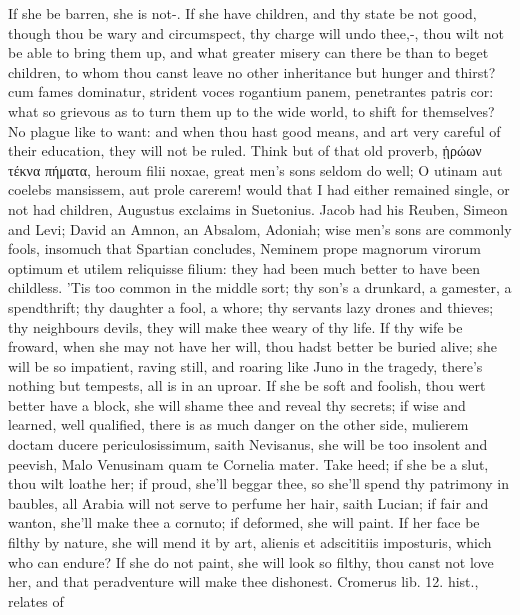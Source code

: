 {If she be barren, she is not-\etc{}. If she have children, and thy
state be not good, though thou be wary and circumspect, thy charge will
undo thee,-, thou wilt not be
able to bring them up, and what greater misery can there be than
to beget children, to whom thou canst leave no other inheritance but
hunger and thirst? cum fames dominatur, strident voces rogantium
panem, penetrantes patris cor: what so grievous as to turn them up to
the wide world, to shift for themselves? No plague like to want: and
when thou hast good means, and art very careful of their education,
they will not be ruled. Think but of that old proverb, ᾑρώων τέκνα
πήματα, heroum filii noxae, great men's sons seldom do well; O utinam
aut coelebs mansissem, aut prole carerem! would that I had either
remained single, or not had children, Augustus exclaims in
Suetonius. Jacob had his Reuben, Simeon and Levi; David an Amnon, an
Absalom, Adoniah; wise men's sons are commonly fools, insomuch that
Spartian concludes, Neminem prope magnorum virorum optimum et utilem
reliquisse filium: they had been much better to have been
childless. 'Tis too common in the middle sort; thy son's a drunkard, a
gamester, a spendthrift; thy daughter a fool, a whore; thy servants
lazy drones and thieves; thy neighbours devils, they will make thee
weary of thy life. If thy wife be froward, when she may not have
her will, thou hadst better be buried alive; she will be so impatient,
raving still, and roaring like Juno in the tragedy, there's nothing but
tempests, all is in an uproar. If she be soft and foolish, thou wert
better have a block, she will shame thee and reveal thy secrets; if
wise and learned, well qualified, there is as much danger on the other
side, mulierem doctam ducere periculosissimum, saith Nevisanus, she
will be too insolent and peevish, Malo Venusinam quam te Cornelia
mater. Take heed; if she be a slut, thou wilt loathe her; if proud,
she'll beggar thee, so she'll spend thy patrimony in baubles, all
Arabia will not serve to perfume her hair, saith Lucian; if fair and
wanton, she'll make thee a cornuto; if deformed, she will paint.
If her face be filthy by nature, she will mend it by art, alienis
et adscititiis imposturis, which who can endure? If she do not paint,
she will look so filthy, thou canst not love her, and that peradventure
will make thee dishonest. Cromerus lib. 12. hist., relates of
}
